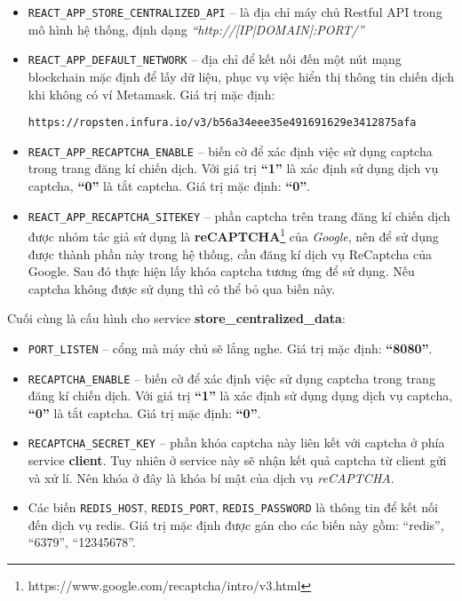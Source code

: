 \documentclass[../main-report.tex]{subfiles}
\begin{document}
\begin{itemize}
\item \texttt{REACT\_APP\_STORE\_CENTRALIZED\_API}  -- là địa chỉ máy chủ Restful API trong mô hình hệ thống, định dạng \textit{``http://[IP|DOMAIN]:PORT/''}
\item \texttt{REACT\_APP\_DEFAULT\_NETWORK} -- địa chỉ để kết nối đến một nút mạng blockchain mặc định để lấy dữ liệu, phục vụ việc hiển thị thông tin chiến dịch khi không có ví Metamask. Giá trị mặc định:

\begin{lstlisting}
https://ropsten.infura.io/v3/b56a34eee35e491691629e3412875afa
\end{lstlisting}

\item \texttt{REACT\_APP\_RECAPTCHA\_ENABLE} -- biến cờ để xác định việc sử dụng captcha trong trang đăng kí chiến dịch. Với giá trị \textbf{``1''} là xác định sử dụng dịch vụ captcha, \textbf{``0''} là tắt captcha. Giá trị mặc định: \textbf{``0''}.
\item \texttt{REACT\_APP\_RECAPTCHA\_SITEKEY} -- phần captcha trên trang đăng kí chiến dịch được nhóm tác giả sử dụng là \textbf{reCAPTCHA}\footnote{https://www.google.com/recaptcha/intro/v3.html} của \textit{Google}, nên để sử dụng được thành phần này trong hệ thống, cần đăng kí dịch vụ ReCaptcha của Google. Sau đó thực hiện lấy khóa captcha tương ứng để sử dụng. Nếu captcha không được sử dụng thì có thể bỏ qua biến này.
\end{itemize}

Cuối cùng là cấu hình cho service \textbf{store\_centralized\_data}:

\begin{itemize}
\item \texttt{PORT\_LISTEN} -- cổng mà máy chủ sẽ lắng nghe. Giá trị mặc định: \textbf{``8080''}.
\item \texttt{RECAPTCHA\_ENABLE} -- biến cờ để xác định việc sử dụng captcha trong trang đăng kí chiến dịch. Với giá trị \textbf{``1''} là xác định sử dụng dụng dịch vụ captcha, \textbf{``0''} là tắt captcha. Giá trị mặc định: \textbf{``0''}.
\item \texttt{RECAPTCHA\_SECRET\_KEY} -- phần khóa captcha này liên kết với captcha ở phía service \textbf{client}. Tuy nhiên ở service này sẽ nhận kết quả captcha từ client gửi và xử lí. Nên khóa ở đây là khóa bí mật của dịch vụ \textit{reCAPTCHA}.
\item Các biến \texttt{REDIS\_HOST}, \texttt{REDIS\_PORT}, \texttt{REDIS\_PASSWORD} là thông tin để kết nối đến dịch vụ redis. Giá trị mặc định được gán cho các biến này gồm: ``redis'', ``6379'', ``12345678''.
\end{itemize}
\end{document}
